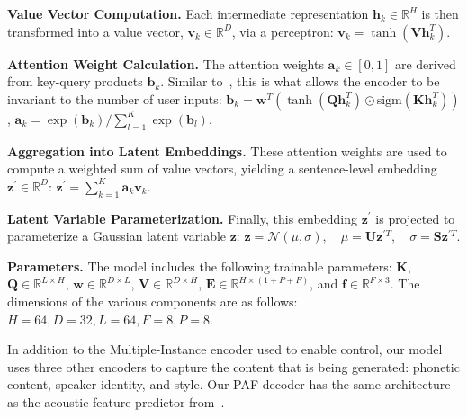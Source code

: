 \documentclass[a4paper,12pt,twoside,openright]{report}
\begin{document}
\textbf{Value Vector Computation.} Each intermediate representation \(\mathbf{h}_k \in \mathbb{R}^H\) is then transformed into a value vector, \(\mathbf{v}_k \in \mathbb{R}^D\), via a perceptron: $\mathbf{v}_k = \tanh \left( \mathbf{V} \mathbf{h}_k^T \right)$.

\textbf{Attention Weight Calculation.} The attention weights \(\mathbf{a}_k \in [0, 1]\) are derived from key-query products \(\mathbf{b}_k\). Similar to~\parencite{Ilse2018AttentionbasedDM}, this is what allows the encoder to be invariant to the number of user inputs: $\mathbf{b}_k = \mathbf{w}^T \left( \tanh \left( \mathbf{Q} \mathbf{h}_k^T \right) \odot \mathrm{sigm} \left( \mathbf{K} \mathbf{h}_k^T \right) \right)$, $\mathbf{a}_k = \exp \left( \mathbf{b}_k \right) / \sum_{l=1}^{K} \exp \left( \mathbf{b}_l \right)$.

\textbf{Aggregation into Latent Embeddings.} These attention weights are used to compute a weighted sum of value vectors, yielding a sentence-level embedding \(\mathbf{z}^\prime \in \mathbb{R}^D\): $\mathbf{z}^\prime = \sum_{k=1}^{K} \mathbf{a}_k \mathbf{v}_k$.

\textbf{Latent Variable Parameterization.} Finally, this embedding \(\mathbf{z}^\prime\) is projected to parameterize a Gaussian latent variable \(\mathbf{z}\): $
\mathbf{z} = \mathcal{N} \left( \mu, \sigma \right), \quad \mu = \mathbf{U} \mathbf{z}^{\prime T}, \quad \sigma = \mathbf{S} \mathbf{z}^{\prime T}$.

\textbf{Parameters.} The model includes the following trainable parameters: $\mathbf{K}$, $\mathbf{Q} \in \mathbb{R}^{L \times H}$, $\mathbf{w} \in \mathbb{R}^{D \times L}$, $\mathbf{V} \in \mathbb{R}^{D \times H}$, $\mathbf{E} \in \mathbb{R}^{H \times (1+P+F)}$, and $\mathbf{f} \in \mathbb{R}^{F \times 3}$. The dimensions of the various components are as follows: \( H = 64, D = 32, L = 64, F = 8, P = 8 \).

In addition to the Multiple-Instance encoder used to enable control, our model uses three other encoders to capture the content that is being generated: phonetic content, speaker identity, and style. 
Our PAF decoder has the same architecture as the acoustic feature predictor from~\parencite{PaperCup-Ctrl-P:2021}. 
\end{document}
